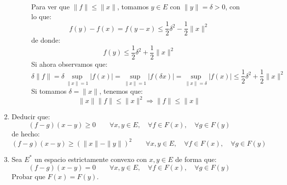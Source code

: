 \begin{ejercicio}
\begin{enumerate}[label=\alph*)]
\begin{description}
                    Para ver que $\|f\|\leq \|x\|$, tomamos $y\in E$ con $\|y\| = \delta>0$, con lo que:
                    \begin{equation*}
                        f(y)-f(x) = f(y-x) \leq \dfrac{1}{2}\delta^2 - \dfrac{1}{2}\|x\|^2
                    \end{equation*}
                    de donde:
                    \begin{equation*}
                        f(y) \leq \dfrac{1}{2}\delta^2 +\dfrac{1}{2}\|x\|^2
                    \end{equation*}
                    Si ahora observamos que:
                    \begin{equation*}
                        \delta\|f\| = \delta\sup_{\|x\|=1}|f(x)| = \sup_{\|x\| =1}|f(\delta x)| = \sup_{\|x\| = \delta}|f(x)| \leq \dfrac{1}{2}\delta^2 + \dfrac{1}{2}\|x\|^2
                    \end{equation*}
                    Si tomamos $\delta=\|x\|$, tenemos que:
                    \begin{equation*}
                        \|x\|\|f\| \leq \|x\|^2 \Longrightarrow \|f\|\leq \|x\|
                    \end{equation*}
            \end{description}
        \item Deducir que:
            \begin{equation*}
                (f-g)(x-y) \geq 0 \qquad \forall x,y\in E, \quad \forall f\in F(x), \quad \forall g\in F(y)
            \end{equation*}
            de hecho:
            \begin{equation*}
                (f-g)(x-y) \geq {(\|x\|- \|y\|)}^{2} \qquad \forall x,y\in E, \quad \forall f\in F(x), \quad \forall g\in F(y)
            \end{equation*}
        \item Sea $E^\ast$ un espacio estrictamente convexo con $x,y\in E$ de forma que:
            \begin{equation*}
                (f-g)(x-y) = 0 \qquad \forall x,y\in E, \quad \forall f\in F(x), \quad \forall g\in F(y)
            \end{equation*}
            Probar que $F(x) = F(y)$.
    \end{enumerate}
\end{ejercicio}



